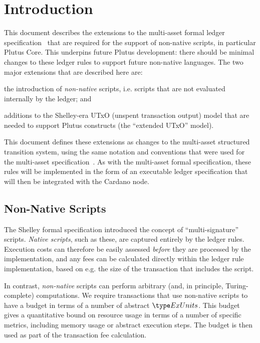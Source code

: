 \section{Introduction}


This document describes the extensions to the multi-asset formal ledger specification~\cite{shelley_ma_spec} that are
required for the support of non-native scripts, in particular Plutus Core. This underpins future Plutus development: there should be minimal changes to these ledger rules to support future non-native languages.
%
The two major extensions that are described here are:

\begin{inparaenum}
\item
the introduction
of \emph{non-native} scripts, i.e. scripts that are not evaluated internally by the ledger; and
\item
  additions to the Shelley-era UTxO (unspent transaction output) model that are needed to support Plutus
  constructs (the ``extended UTxO'' model).
\end{inparaenum}

This document defines these extensions as changes to the multi-asset structured transition system,
using the same notation and conventions that were used for the multi-asset specification~\cite{shelley_ma_spec}.
As with the multi-asset formal specification, these rules will be implemented in the form of an executable ledger specification that will then be
integrated with the Cardano node.

\subsection{Non-Native Scripts}

The Shelley formal specification introduced the concept of ``multi-signature'' scripts.
\emph{Native scripts}, such as these, are captured entirely by the ledger rules.
Execution costs can therefore be easily assessed \emph{before} they are processed by the implementation,
and any fees can be calculated directly within the ledger rule implementation,
based on e.g. the size of the transaction that includes the script.

In contrast, \emph{non-native} scripts can perform arbitrary
(and, in principle, Turing-complete) computations.
We require transactions that use non-native scripts
to have a budget in terms of a number of abstract $\ExUnits$.
This budget gives a quantitative bound on resource usage in terms of a number of specific metrics, including memory usage or abstract execution steps.
The budget is then used as part of the transaction fee calculation.

